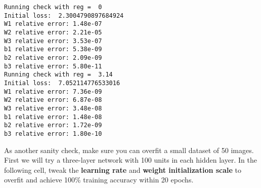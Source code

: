 \documentclass[11pt]{article}
\begin{document}
    \begin{Verbatim}[commandchars=\\\{\}]
Running check with reg =  0
Initial loss:  2.3004790897684924
W1 relative error: 1.48e-07
W2 relative error: 2.21e-05
W3 relative error: 3.53e-07
b1 relative error: 5.38e-09
b2 relative error: 2.09e-09
b3 relative error: 5.80e-11
Running check with reg =  3.14
Initial loss:  7.052114776533016
W1 relative error: 7.36e-09
W2 relative error: 6.87e-08
W3 relative error: 3.48e-08
b1 relative error: 1.48e-08
b2 relative error: 1.72e-09
b3 relative error: 1.80e-10
    \end{Verbatim}

    As another sanity check, make sure you can overfit a small dataset of 50
images. First we will try a three-layer network with 100 units in each
hidden layer. In the following cell, tweak the \textbf{learning rate}
and \textbf{weight initialization scale} to overfit and achieve 100\%
training accuracy within 20 epochs.
\end{document}
